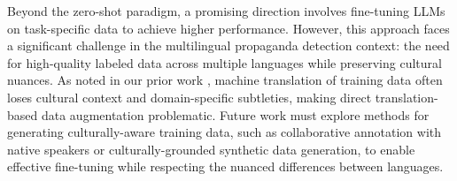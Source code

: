 Beyond the zero-shot paradigm, a promising direction involves fine-tuning LLMs on task-specific data to achieve higher performance. However, this approach faces a significant challenge in the multilingual propaganda detection context: the need for high-quality labeled data across multiple languages while preserving cultural nuances. As noted in our prior work \citep{eljadiri-nurbakova-2025-team}, machine translation of training data often loses cultural context and domain-specific subtleties, making direct translation-based data augmentation problematic. Future work must explore methods for generating culturally-aware training data, such as collaborative annotation with native speakers or culturally-grounded synthetic data generation, to enable effective fine-tuning while respecting the nuanced differences between languages.